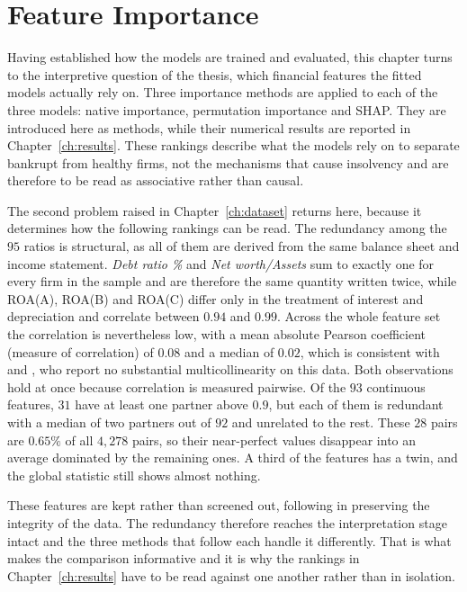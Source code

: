 \chapter{Feature Importance}
\label{ch:featureimportance}

Having established how the models are trained and evaluated, this chapter turns to
the interpretive question of the thesis, which financial features the fitted models
actually rely on. Three importance methods are applied to each of the three models:
native importance, permutation importance and SHAP. They are introduced here as
methods, while their numerical results are reported in Chapter~\ref{ch:results}.
These rankings describe what the models rely on to separate bankrupt from healthy
firms, not the mechanisms that cause insolvency and are therefore to be read as
associative rather than causal.

The second problem raised in Chapter~\ref{ch:dataset} returns here, because it
determines how the following rankings can be read. The redundancy among the $95$
ratios is structural, as all of them are derived from the same balance sheet and
income statement. \emph{Debt ratio \%} and \emph{Net worth/Assets} sum to exactly one
for every firm in the sample and are therefore the same quantity written twice,
while ROA(A), ROA(B) and ROA(C) differ only in the treatment of interest and
depreciation and correlate between $0.94$ and $0.99$. Across 
the whole feature set the correlation is nevertheless low, with a mean
absolute Pearson coefficient (measure of correlation) of $0.08$ and a median of $0.02$, which is consistent
with \textcite[5]{wangliu2021} and \textcite[7]{ansahnarh2024}, who report no substantial
multicollinearity on this data. Both observations hold at once because correlation
is measured pairwise. Of the $93$ continuous features, $31$ have at least one partner
above $0.9$, but each of them is redundant with a median of two partners out of $92$
and unrelated to the rest. These $28$ pairs are $0.65\%$ of all $4{,}278$ pairs, so
their near-perfect values disappear into an average dominated by the remaining ones.
A third of the features has a twin, and the global statistic still shows almost
nothing.

These features are kept rather than screened out, following \textcite{wangliu2021} in
preserving the integrity of the data. The redundancy therefore reaches the
interpretation stage intact and the three methods that follow each handle it
differently. That is what makes the comparison informative and it is why the
rankings in Chapter~\ref{ch:results} have to be read against one another rather than
in isolation.

